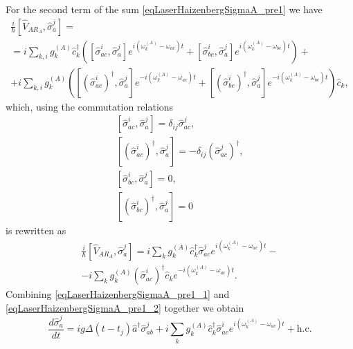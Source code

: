 For the second term of the sum \eqref{eqLaserHaizenbergSigmaA_pre1} we have
\begin{eqnarray}
\frac{i}{\hbar}
\left[\hat{V}_{AR_A}, \hat{\sigma}_a^j\right] = 
\nonumber \\
=
i
\sum_{k,i}
g_k^{(A)}
\hat{c}_k^{\dag}
 \left(
\left[\hat{\sigma}^{i}_{ac},\hat{\sigma}_a^j\right]  
e^{i\left(\omega_k^{(A)} - \omega_{ac}\right)t}
+ 
\left[\hat{\sigma}^{i}_{bc},\hat{\sigma}_a^j\right]  
e^{i\left(\omega_k^{(A)} - \omega_{bc}\right)t}
\right)
+
\nonumber \\
+
 i
\sum_{k,i}
g_k^{(A)}
 \left(
\left[\left(\hat{\sigma}^{i}_{ac}\right)^{\dag},\hat{\sigma}_a^j\right]  
e^{-i\left(\omega_k^{(A)} - \omega_{ac}\right)t}
+ 
\left[\left(\hat{\sigma}^{i}_{bc}\right)^{\dag},\hat{\sigma}_a^j\right]  
e^{-i\left(\omega_k^{(A)} - \omega_{bc}\right)t}
\right)\hat{c}_k,
\nonumber
\end{eqnarray}
which, using the commutation relations
\begin{eqnarray}
\left[\hat{\sigma}^{i}_{ac},\hat{\sigma}_a^j\right] = 
\delta_{ij}\hat{\sigma}^{j}_{ac},
\nonumber \\
\left[\left(\hat{\sigma}^{i}_{ac}\right)^{\dag},\hat{\sigma}_a^j\right] = 
- \delta_{ij}\left(\hat{\sigma}^{j}_{ac}\right)^{\dag},
\nonumber \\
\left[\hat{\sigma}^{i}_{bc},\hat{\sigma}_a^j\right] = 0,
\nonumber \\
\left[\left(\hat{\sigma}^{i}_{bc}\right)^{\dag},\hat{\sigma}_a^j\right] = 0
\label{eqLaserHaizenbergTaskKommutator}
\end{eqnarray}
is rewritten as
\begin{eqnarray}
\frac{i}{\hbar}
\left[\hat{V}_{AR_A}, \hat{\sigma}_a^j\right] = 
i
\sum_{k}
g_k^{(A)}
\hat{c}_k^{\dag}\hat{\sigma}^{j}_{ac}  
e^{i\left(\omega_k^{(A)} - \omega_{ac}\right)t}
-
\nonumber \\
- i
\sum_{k}
g_k^{(A)}
\left(\hat{\sigma}^{i}_{ac}\right)^{\dag} 
\hat{c}_k
e^{-i\left(\omega_k^{(A)} - \omega_{ac}\right)t}.
\label{eqLaserHaizenbergSigmaA_pre1_2}
\end{eqnarray}
Combining \eqref{eqLaserHaizenbergSigmaA_pre1_1} and 
\eqref{eqLaserHaizenbergSigmaA_pre1_2} together we obtain
\begin{equation}
\frac{d \hat{\sigma}_a^j}{d t} = 
i g 
\Delta\left(t - t_j\right) 
\hat{a}^{\dag}\hat{\sigma}^{j}_{ab}  +
i
\sum_{k}
g_k^{(A)}
\hat{c}_k^{\dag}\hat{\sigma}^{i}_{ac}  
e^{i\left(\omega_k^{(A)} - \omega_{ac}\right)t} + \mbox{h.c.}
\label{eqLaserHaizenbergSigmaA_pre2}
\end{equation}

